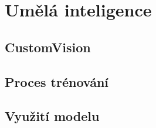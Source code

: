 \section{Umělá inteligence}

\subsection{CustomVision}

\subsection{Proces trénování}

\subsection{Využití modelu}
